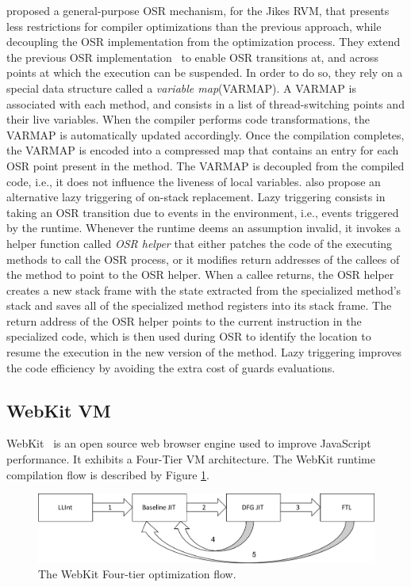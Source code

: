  proposed a general-purpose OSR mechanism, for the Jikes RVM, that presents less restrictions for compiler optimizations than the previous approach, while decoupling the OSR implementation from the optimization process.
They extend the previous OSR implementation~\cite{fink2003design} to enable OSR transitions at, and across points at which the execution can be suspended.
In order to do so, they rely on a special data structure called a \textit{variable map}(VARMAP).
A VARMAP is associated with each method, and consists in a list of thread-switching points and their live variables.
When the compiler performs code transformations, the VARMAP is automatically updated accordingly.
Once the compilation completes, the VARMAP is encoded into a compressed map that contains an entry for each OSR point present in the method.
The VARMAP is decoupled from the compiled code, i.e., it does not influence the liveness of local variables.
 also propose an alternative lazy triggering of on-stack replacement.
Lazy triggering consists in taking an OSR transition due to events in the environment, i.e., events triggered by the runtime. 
Whenever the runtime deems an assumption invalid, it invokes a helper function called \textit{OSR helper} that either patches the code of the executing methods to call the OSR process, or it modifies return addresses of the callees of the method to point to the OSR helper.
When a callee returns, the OSR helper creates a new stack frame with the state extracted from the specialized method's stack and saves all of the specialized method registers into its stack frame. 
The return address of the OSR helper points to the current instruction in the specialized code, which is then used during OSR to identify the location to resume the execution in the new version of the method.
Lazy triggering improves the code efficiency by avoiding the extra cost of guards evaluations.\\

\subsection{WebKit VM}\label{webkit}

WebKit~\cite{WebKitURL} is an open source web browser engine used to improve JavaScript performance.
It exhibits a Four-Tier VM architecture. 
The WebKit runtime compilation flow is described by Figure \ref{FTL}.\\
\begin{figure}[h]
\centering
\includegraphics[scale=0.5]{Figures/FTL.pdf}
\decoRule
\caption[The WebKit FTL]{The WebKit Four-tier optimization flow.}
\label{FTL}
\end{figure}
 

